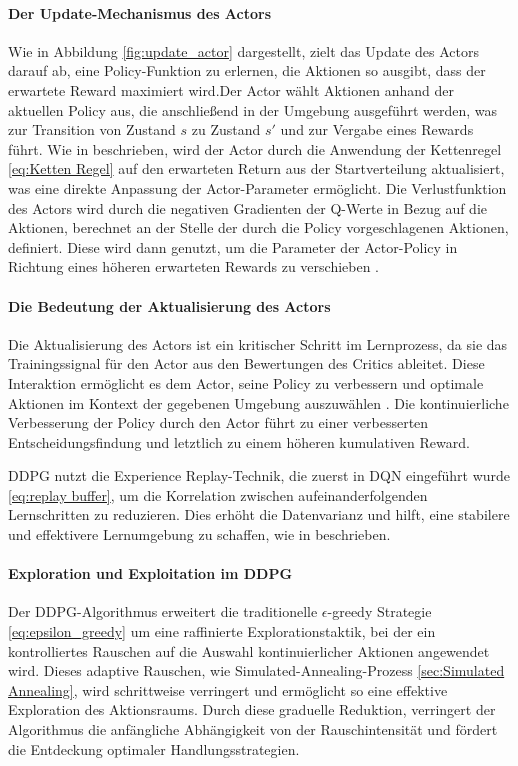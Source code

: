 \paragraph{Der Update-Mechanismus des Actors}
Wie in Abbildung \ref{fig:update_actor} dargestellt, zielt das Update des Actors darauf ab, eine Policy-Funktion zu erlernen, die Aktionen so ausgibt, dass der erwartete Reward maximiert wird.Der Actor wählt Aktionen anhand der aktuellen Policy aus, die anschließend in der Umgebung ausgeführt werden, was zur Transition von Zustand \(s\) zu Zustand \(s'\) und zur Vergabe eines Rewards führt. Wie in \cite{Lillicrap2016DDPG} beschrieben, wird der Actor durch die Anwendung der Kettenregel \ref{eq:Ketten Regel} auf den erwarteten Return aus der Startverteilung aktualisiert, was eine direkte Anpassung der Actor-Parameter ermöglicht. Die Verlustfunktion des Actors wird durch die negativen Gradienten der Q-Werte in Bezug auf die Aktionen, berechnet an der Stelle der durch die Policy vorgeschlagenen Aktionen, definiert. Diese wird dann genutzt, um die Parameter der Actor-Policy in Richtung eines höheren erwarteten Rewards zu verschieben \cite{Lillicrap2016DDPG}.


\paragraph{Die Bedeutung der Aktualisierung des Actors}
Die Aktualisierung des Actors ist ein kritischer Schritt im Lernprozess, da sie das Trainingssignal für den Actor aus den Bewertungen des Critics ableitet. Diese Interaktion ermöglicht es dem Actor, seine Policy zu verbessern und optimale Aktionen im Kontext der gegebenen Umgebung auszuwählen \cite{Luck2019ImprovedExploration}. Die kontinuierliche Verbesserung der Policy durch den Actor führt zu einer verbesserten Entscheidungsfindung und letztlich zu einem höheren kumulativen Reward.

DDPG nutzt die Experience Replay-Technik, die zuerst in DQN eingeführt wurde \ref{eq:replay buffer}, um die Korrelation zwischen aufeinanderfolgenden Lernschritten zu reduzieren. Dies erhöht die Datenvarianz und hilft, eine stabilere und effektivere Lernumgebung zu schaffen, wie in \cite{Wu2018AggregatedMultiDDPG} beschrieben. 


\paragraph{Exploration und Exploitation im DDPG}

Der DDPG-Algorithmus erweitert die traditionelle \(\epsilon\)-greedy Strategie \ref{eq:epsilon_greedy} um eine raffinierte Explorationstaktik, bei der ein kontrolliertes Rauschen auf die Auswahl kontinuierlicher Aktionen angewendet wird. Dieses adaptive Rauschen, wie  Simulated-Annealing-Prozess \ref{sec:Simulated Annealing}, wird schrittweise verringert und ermöglicht so eine effektive Exploration des Aktionsraums. Durch diese graduelle Reduktion, verringert der Algorithmus die anfängliche Abhängigkeit von der Rauschintensität und fördert die Entdeckung optimaler Handlungsstrategien.


